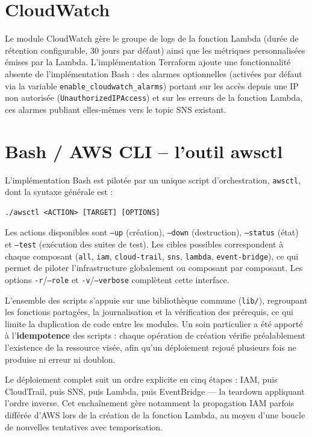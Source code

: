 \documentclass[11pt,a4paper]{report}
\begin{document}
\section{CloudWatch}

Le module CloudWatch gère le groupe de logs de la fonction Lambda (durée de rétention configurable, 30 jours par défaut) ainsi que les métriques personnalisées émises par la Lambda. L'implémentation Terraform ajoute une fonctionnalité absente de l'implémentation Bash : des alarmes optionnelles (activées par défaut via la variable \texttt{enable\_cloudwatch\_alarms}) portant sur les accès depuis une IP non autorisée (\texttt{UnauthorizedIPAccess}) et sur les erreurs de la fonction Lambda, ces alarmes publiant elles-mêmes vers le topic SNS existant.

\section{Bash / AWS CLI -- l'outil awsctl}

L'implémentation Bash est pilotée par un unique script d'orchestration, \texttt{awsctl}, dont la syntaxe générale est :

\begin{lstlisting}
./awsctl <ACTION> [TARGET] [OPTIONS]
\end{lstlisting}

Les actions disponibles sont \texttt{--up} (création), \texttt{--down} (destruction), \texttt{--status} (état) et \texttt{--test} (exécution des suites de test). Les cibles possibles correspondent à chaque composant (\texttt{all}, \texttt{iam}, \texttt{cloud-trail}, \texttt{sns}, \texttt{lambda}, \texttt{event-bridge}), ce qui permet de piloter l'infrastructure globalement ou composant par composant. Les options \texttt{-r}/\texttt{--role} et \texttt{-v}/\texttt{--verbose} complètent cette interface.

L'ensemble des scripts s'appuie sur une bibliothèque commune (\texttt{lib/}), regroupant les fonctions partagées, la journalisation et la vérification des prérequis, ce qui limite la duplication de code entre les modules. Un soin particulier a été apporté à l'\textbf{idempotence} des scripts : chaque opération de création vérifie préalablement l'existence de la ressource visée, afin qu'un déploiement rejoué plusieurs fois ne produise ni erreur ni doublon.

Le déploiement complet suit un ordre explicite en cinq étapes : IAM, puis CloudTrail, puis SNS, puis Lambda, puis EventBridge — la teardown appliquant l'ordre inverse. Cet enchaînement gère notamment la propagation IAM parfois différée d'AWS lors de la création de la fonction Lambda, au moyen d'une boucle de nouvelles tentatives avec temporisation.
\end{document}
